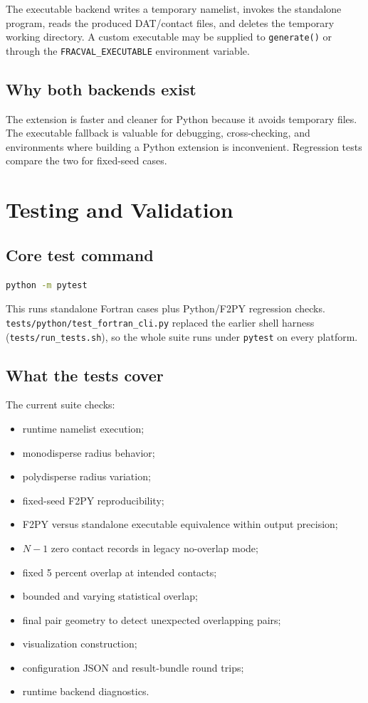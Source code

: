 \documentclass[11pt,oneside]{report}
\newcommand{\code}[1]{\texttt{#1}}
\begin{document}
The executable backend writes a temporary namelist, invokes the standalone
program, reads the produced DAT/contact files, and deletes the temporary
working directory. A custom executable may be supplied to \code{generate()} or
through the \code{FRACVAL\_EXECUTABLE} environment variable.

\section{Why both backends exist}

The extension is faster and cleaner for Python because it avoids temporary
files. The executable fallback is valuable for debugging, cross-checking, and
environments where building a Python extension is inconvenient. Regression
tests compare the two for fixed-seed cases.

\chapter{Testing and Validation}

\section{Core test command}

\begin{lstlisting}[language=bash]
python -m pytest
\end{lstlisting}

This runs standalone Fortran cases plus Python/F2PY regression checks.
\code{tests/python/test\_fortran\_cli.py} replaced the earlier shell harness
(\code{tests/run\_tests.sh}), so the whole suite runs under \code{pytest} on
every platform.

\section{What the tests cover}

The current suite checks:
\begin{itemize}
  \item runtime namelist execution;
  \item monodisperse radius behavior;
  \item polydisperse radius variation;
  \item fixed-seed F2PY reproducibility;
  \item F2PY versus standalone executable equivalence within output precision;
  \item \(N-1\) zero contact records in legacy no-overlap mode;
  \item fixed 5 percent overlap at intended contacts;
  \item bounded and varying statistical overlap;
  \item final pair geometry to detect unexpected overlapping pairs;
  \item visualization construction;
  \item configuration JSON and result-bundle round trips;
  \item runtime backend diagnostics.
\end{itemize}
\end{document}
